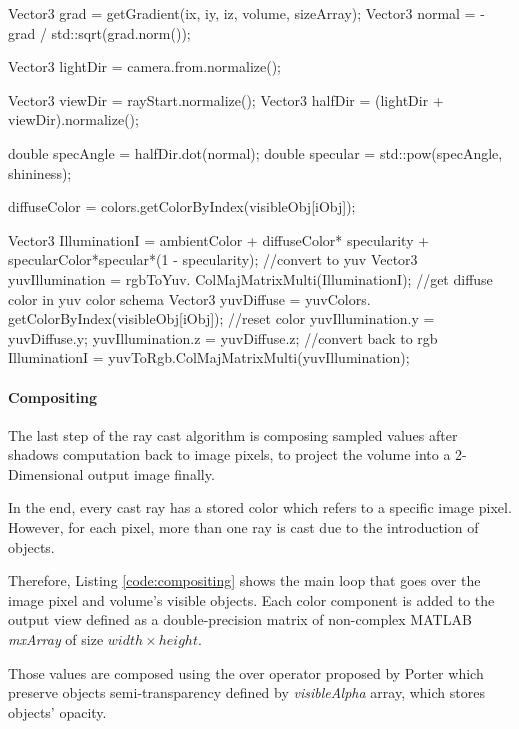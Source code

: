 \documentclass[12pt,a4paper]{extarticle}
\newcommand{\linespace}{\vspace{8pt}}
\begin{document}
\begin{cpp}[caption={Blinn-Phong reflection computation using voxel's gradient as surface normal and colors in YUV space to preserve selected input color but not luminosity},label=code:shadowing]
Vector3 grad = getGradient(ix, iy, iz, volume, sizeArray);
Vector3 normal = -grad / std::sqrt(grad.norm());

Vector3 lightDir = camera.from.normalize();

Vector3 viewDir = rayStart.normalize();
Vector3 halfDir = (lightDir + viewDir).normalize();

double specAngle = halfDir.dot(normal);
double specular = std::pow(specAngle, shininess);

diffuseColor = colors.getColorByIndex(visibleObj[iObj]);

Vector3 IlluminationI = ambientColor + diffuseColor* 
specularity + specularColor*specular*(1 - specularity);
//convert to yuv
Vector3 yuvIllumination = rgbToYuv.
		ColMajMatrixMulti(IlluminationI);
//get diffuse color in yuv color schema
Vector3 yuvDiffuse = yuvColors.
		getColorByIndex(visibleObj[iObj]);
//reset color
yuvIllumination.y = yuvDiffuse.y;
yuvIllumination.z = yuvDiffuse.z;
//convert back to rgb
IlluminationI = yuvToRgb.ColMajMatrixMulti(yuvIllumination);
\end{cpp}

\paragraph{Compositing} The last step of the ray cast algorithm is composing sampled values after shadows computation back to image pixels, to project the volume into a 2-Dimensional output image finally.

In the end, every cast ray has a stored color which refers to a specific image pixel. However, for each pixel, more than one ray is cast due to the introduction of objects.
\linespace

Therefore, Listing \ref{code:compositing} shows the main loop that goes over the image pixel and volume's visible objects. Each color component is added to the output view defined as a double-precision matrix of non-complex MATLAB \textit{mxArray} of size $width\times height$. 

Those values are composed using the over operator proposed by Porter which preserve objects semi-transparency defined by \textit{visibleAlpha} array, which stores objects' opacity. 
\end{document}
